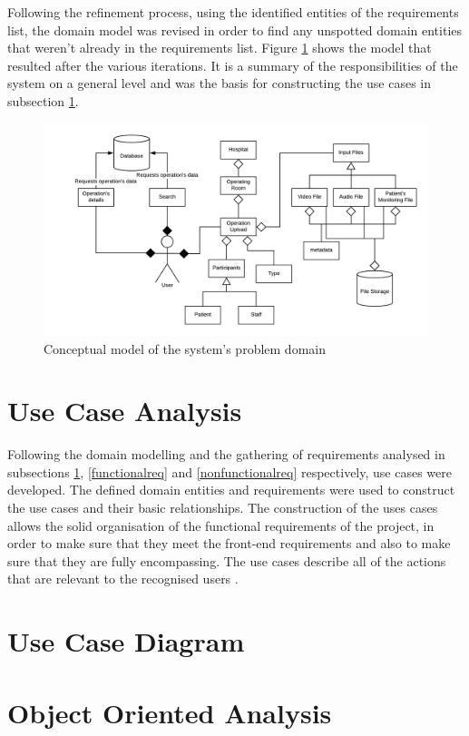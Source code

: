 Following the refinement process, using the identified entities of the requirements list, the domain model was revised in order to find any unspotted domain entities that weren't already in the requirements list. 
Figure \ref{domain_model} shows the model that resulted after the various iterations. It is a summary of the responsibilities of the system on a general level and was the basis for constructing the use cases in subsection \ref{sub:use_case_analysis}.

\begin{figure}[h]
\begin{center}
\includegraphics[width=17cm]{imgs/Domain_Model.png}
\end{center}\vspace{-0.3cm}
\caption[Domain Model]{Conceptual model of the system's problem domain} \label{domain_model}
\end{figure}



\section{Use Case Analysis}
\label{sub:use_case_analysis}

Following the domain modelling and the gathering of requirements analysed in subsections \ref{domain_model}, \ref{functionalreq} and \ref{nonfunctionalreq} respectively, use cases were developed. The defined domain entities and requirements were used to construct the use cases and their basic relationships. The construction of the uses cases allows the solid organisation of the functional requirements of the project, in order to make sure that they meet the front-end requirements and also to make sure that they are fully encompassing. The use cases describe all of the actions that are relevant to the recognised users \citep{usecases}. 


\section{Use Case Diagram}
\label{sub:use_case_diagram}

\section{Object Oriented Analysis}
\label{sub:object_oriented_analysis}



\blindtext
\blindtext

